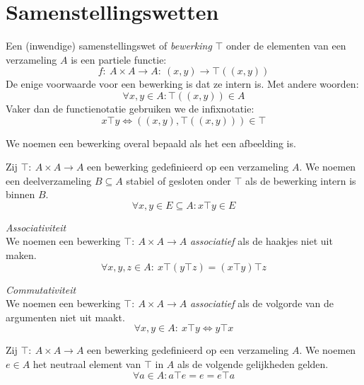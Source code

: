 \documentclass[main.tex]{subfiles}
\begin{document}
\chapter{Samenstellingswetten}
\label{cha:samenstellingswetten}

\begin{de}
  Een (inwendige) samenstellingswet of \emph{bewerking} $\top$ onder de elementen van een verzameling $A$ is een partiele functie:
  \[ f:\ A\times A \rightarrow A:\ (x,y) \rightarrow \top((x,y)) \]
  De enige voorwaarde voor een bewerking is dat ze intern is.
  Met andere woorden:
  \[ \forall x,y \in A: \top((x,y)) \in A \]
  Vaker dan de functienotatie gebruiken we de infixnotatie:
  \[ x \top y \Leftrightarrow  ((x,y),\top((x,y))) \in \top \]
\end{de}

\begin{de}
  We noemen een bewerking overal bepaald als het een afbeelding is.
\end{de}

\begin{de}
  Zij $\top:\ A\times A\rightarrow A$ een bewerking gedefinieerd op een verzameling $A$.
  We noemen een deelverzameling $B\subseteq A$ stabiel of gesloten onder $\top$ als de bewerking intern is binnen $B$.
  \[ \forall x,y \in E\subseteq A: x \top y \in E \]
\end{de}

\begin{de}
  \emph{Associativiteit}\\
  We noemen een bewerking $\top:\ A\times A\rightarrow A$ \emph{associatief} als de haakjes niet uit maken.
  \[ \forall x,y,z \in A:\ x\top(y\top z) = (x\top y) \top z \]
\end{de}

\begin{de}
  \emph{Commutativiteit}\\
  We noemen een bewerking $\top:\ A\times A\rightarrow A$ \emph{associatief} als de volgorde van de argumenten niet uit maakt.
  \[ \forall x,y \in A:\ x \top y \Leftrightarrow y \top x \]
\end{de}

\begin{de}
  Zij $\top:\ A\times A\rightarrow A$ een bewerking gedefinieerd op een verzameling $A$.
  We noemen $e\in A$ het neutraal element van $\top$ in $A$ als de volgende gelijkheden gelden.
  \[ \forall a \in A: a\top e = e = e\top a \]
\end{de}
\end{document}
